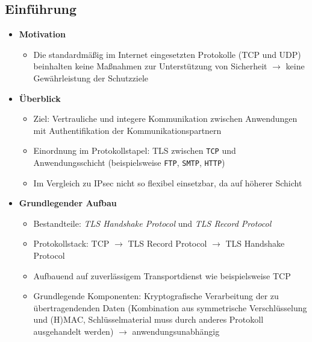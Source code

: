 \subsection{Einführung}
\begin{itemize}
	\item \textbf{Motivation}
	\begin{itemize}
		\item Die standardmäßig im Internet eingesetzten Protokolle (TCP und UDP) beinhalten keine Maßnahmen zur Unterstützung von Sicherheit \(\rightarrow\) keine Gewährleistung der Schutzziele
	\end{itemize}
	\item \textbf{Überblick}
	\begin{itemize}
		\item Ziel: Vertrauliche und integere Kommunikation zwischen Anwendungen mit Authentifikation der Kommunikationspartnern
		\item Einordnung im Protokollstapel: TLS zwischen \texttt{TCP} und Anwendungsschicht (beispielsweise \texttt{FTP}, \texttt{SMTP}, \texttt{HTTP})
		\item Im Vergleich zu IPsec nicht so flexibel einsetzbar, da auf höherer Schicht
	\end{itemize}
	\item \textbf{Grundlegender Aufbau}
	\begin{itemize}
		\item Bestandteile: \textit{TLS Handshake Protocol} und \textit{TLS Record Protocol}
		\item Protokollstack: TCP \(\rightarrow\) TLS Record Protocol \(\rightarrow\) TLS Handshake Protocol
		\item Aufbauend auf zuverlässigem Transportdienst wie beispielsweise TCP
		\item Grundlegende Komponenten: Kryptografische Verarbeitung der zu übertragendenden Daten (Kombination aus symmetrische Verschlüsselung und (H)MAC, Schlüsselmaterial muss durch anderes Protokoll ausgehandelt werden) \(\rightarrow\) anwendungsunabhängig
	\end{itemize}
\end{itemize}


